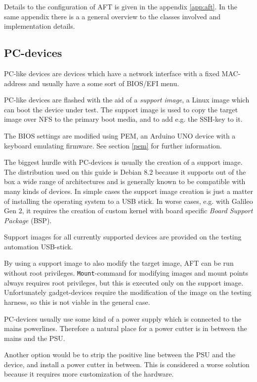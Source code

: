 \documentclass[a4paper,11pt]{article}
\newcommand{\cmd}[1]{\texttt{#1}}
\begin{document}
Details to the configuration of AFT is given in the appendix \ref{app:aft}. In the same appendix there is a a general overview to the classes involved and implementation details.

\subsection{PC-devices}
\label{pc}
PC-like devices are devices which have a network interface with a fixed MAC-address and usually have a some sort of BIOS/EFI menu.

PC-like devices are flashed with the aid of a \textit{support image}, a Linux image which can boot the device under test. The support image is used to copy the target image over NFS to the primary boot media, and to add e.g. the SSH-key to it.

The BIOS settings are modified using PEM, an Arduino UNO device with a keyboard emulating firmware. See section \ref{pem} for further information.

The biggest hurdle with PC-devices is usually the creation of a support image. The distribution used on this guide is Debian 8.2 because it supports out of the box a wide range of architectures and is generally known to be compatible with many kinds of devices. In simple cases the support image creation is just a matter of installing the operating system to a USB stick. In worse cases, e.g. with Galileo Gen 2, it requires the creation of custom kernel with board specific \textit{Board Support Package} (BSP).

Support images for all currently supported devices are provided on the testing automation USB-stick.

By using a support image to also modify the target image, AFT can be run without root privileges. \cmd{Mount}-command for modifying images and mount points always requires root privileges, but this is executed only on the support image. Unfortunately gadget-devices require the modification of the image on the testing harness, so this is not viable in the general case.

PC-devices usually use some kind of a power supply which is connected to the mains powerlines. Therefore a natural place for a power cutter is in between the mains and the PSU.

Another option would be to strip the positive line between the PSU and the device, and install a power cutter in between. This is considered a worse solution because it requires more customization of the hardware.
\end{document}
